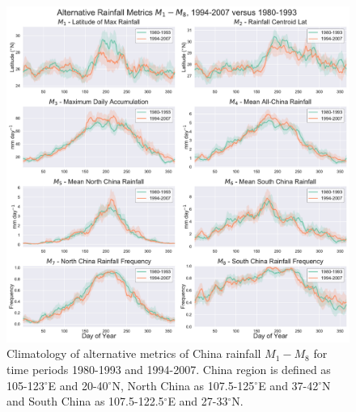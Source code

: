\documentclass[singlecolumn,11pt]{pnas-new}
\begin{document}
\begin{figure}[htb]
\centering
\includegraphics[width=36pc]{Figures/alternative_metrics_9407_8093}
\caption{Climatology of alternative metrics of China rainfall $M_1-M_8$ for time periods 1980-1993 and 1994-2007. China region is defined as 105-123$^{\circ}$E and 20-40$^{\circ}$N, North China as 107.5-125$^{\circ}$E and 37-42$^{\circ}$N and South China as 107.5-122.5$^{\circ}$E and 27-33$^{\circ}$N.}
\label{fig:alternative_metrics_2}
\end{figure}
\end{document}
